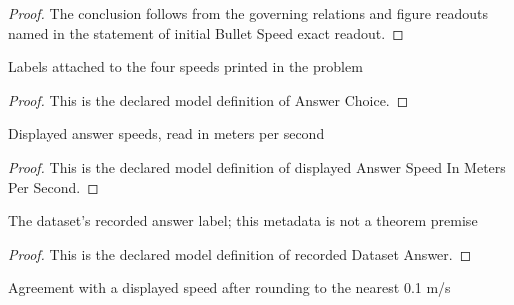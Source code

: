 \begin{proof}
  The conclusion follows from the governing relations and figure readouts named in the statement of initial Bullet Speed exact readout.
\end{proof}
\begin{definition}
  \label{def:physics:phyx-mini-0202:phyxminiproblems-problemphyxmini0202-answerchoice}
  Labels attached to the four speeds printed in the problem
\end{definition}
\begin{proof}
  This is the declared model definition of Answer Choice.
\end{proof}
\begin{definition}
  \label{def:physics:phyx-mini-0202:phyxminiproblems-problemphyxmini0202-displayedanswerspeedinmeterspersecond}
  Displayed answer speeds, read in meters per second
\end{definition}
\begin{proof}
  This is the declared model definition of displayed Answer Speed In Meters Per Second.
\end{proof}
\begin{definition}
  \label{def:physics:phyx-mini-0202:phyxminiproblems-problemphyxmini0202-recordeddatasetanswer}
  The dataset's recorded answer label; this metadata is not a theorem premise
\end{definition}
\begin{proof}
  This is the declared model definition of recorded Dataset Answer.
\end{proof}
\begin{definition}
  \label{def:physics:phyx-mini-0202:phyxminiproblems-problemphyxmini0202-roundstonearesttenthmeterpersecond}
  Agreement with a displayed speed after rounding to the nearest 0.1 m/s
\end{definition}

